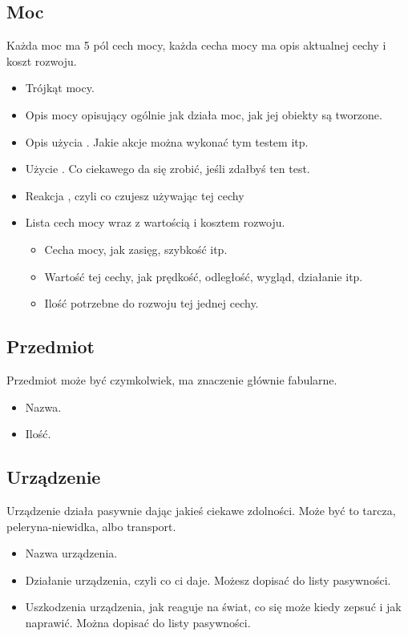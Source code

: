 \subsection{Moc}
Każda moc ma 5 pól cech mocy, każda cecha mocy ma opis aktualnej cechy i koszt rozwoju.
\begin{itemize} 
\item Trójkąt mocy.
\item Opis mocy opisujący ogólnie jak działa moc, jak jej obiekty są tworzone.
\item Opis użycia \absm{}. Jakie akcje można wykonać tym testem itp.
\item Użycie \abdm{}. Co ciekawego da się zrobić, jeśli zdałbyś ten test.
\item Reakcja \abrm{}, czyli co czujesz używając tej cechy
\item Lista cech mocy wraz z wartością i kosztem rozwoju.
\begin{itemize}
 \item Cecha mocy, jak zasięg, szybkość itp.
 \item Wartość tej cechy, jak prędkość, odległość, wygląd, działanie itp.
 \item Ilość \xpmcn{} potrzebne do rozwoju tej jednej cechy.
\end{itemize}
\end{itemize}

\subsection{Przedmiot}
Przedmiot może być czymkolwiek, ma znaczenie głównie fabularne.
\begin{itemize}
 \item Nazwa.
 \item Ilość.
\end{itemize}

\subsection{Urządzenie}
Urządzenie działa pasywnie dając jakieś ciekawe zdolności.
Może być to tarcza, peleryna-niewidka, albo transport.
\begin{itemize}
\item Nazwa urządzenia.
\item Działanie urządzenia, czyli co ci daje. Możesz dopisać do listy pasywności.
\item Uszkodzenia urządzenia, jak reaguje na świat, co się może kiedy zepsuć i jak naprawić. Można dopisać do listy pasywności.
\end{itemize}

